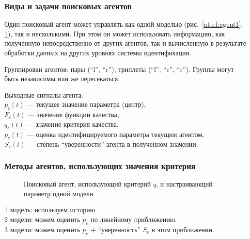 \documentclass[10pt,utf8]{beamer}
\begin{document}
\begin{frame}
  \frametitle{Виды и задачи поисковых агентов}

  Один поисковый агент может управлять как одной моделью (рис.~\ref{atu:f:agent1}, \ref{atu:f:agent1q}),
  так и несколькими. %
  При этом он может использовать информацию,
  как полученную непосредственно от других агентов,
  так и вычисленную в результате обработки данных на других уровнях системы идентификации.

  \vfill

  Группировки агентов: пары (``l'', ``r''), триплеты (``l'', ``c'', ``r'').
  Группы могут быть независимы или же пересекаться.

  \vfill

  Выходные сигналы агента: \\
  $p_c(t)$ --- текущее значение параметра (центр), \\
  $F_c(t)$ --- значение функции качества, \\
  $q_c(t)$ --- значение критерия качества, \\
  $p_e(t)$ --- оценка идентифицируемого параметра текущим агентом, \\
  $S_e(t)$ --- степень ``уверенности'' агента в полученном значении.

\end{frame}







\begin{frame}
  \frametitle{Методы агентов, использующих значения критерия}

  \begin{figure}[htb!]
  \begin{center}
  
  \end{center}
  \caption{Поисковый агент, использующий критерий $q$, и настраивающий параметр одной модели}
  \label{atu:f:agent1q}
  \end{figure}

  \vspace{-3ex}
  1 модель: используем историю. \\
  2 модели: можем оценить $p_e$ по линейному приближению. \\
  3 модели: можем оценить $p_e$ + ``уверенность'' $S_e$ в этом приближении.


\end{frame}
\end{document}
